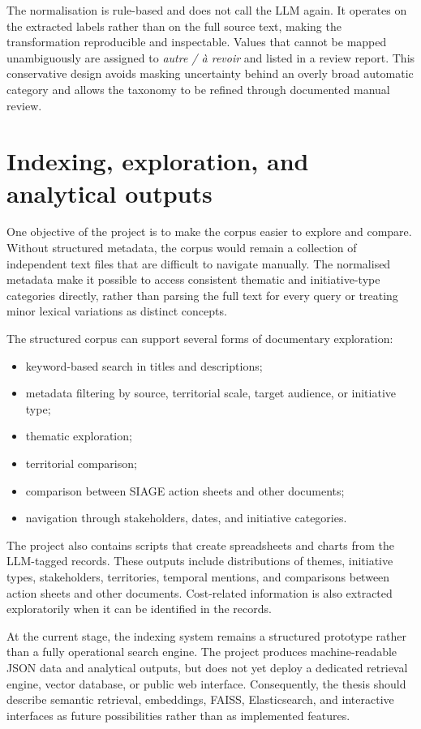 \documentclass[
11pt,
english,
singlespacing,
headsepline,
]{MastersDoctoralThesis}
\begin{document}
The normalisation is rule-based and does not call the LLM again. It operates on
the extracted labels rather than on the full source text, making the
transformation reproducible and inspectable. Values that cannot be mapped
unambiguously are assigned to \textit{autre / à revoir} and listed in a review
report. This conservative design avoids masking uncertainty behind an overly
broad automatic category and allows the taxonomy to be refined through
documented manual review.


\section{Indexing, exploration, and analytical outputs}

One objective of the project is to make the corpus easier to explore and compare.
Without structured metadata, the corpus would remain a collection of independent
text files that are difficult to navigate manually. The normalised metadata make
it possible to access consistent thematic and initiative-type categories
directly, rather than parsing the full text for every query or treating minor
lexical variations as distinct concepts.

The structured corpus can support several forms of documentary exploration:

\begin{itemize}
    \item keyword-based search in titles and descriptions;
    \item metadata filtering by source, territorial scale, target audience, or
    initiative type;
    \item thematic exploration;
    \item territorial comparison;
    \item comparison between SIAGE action sheets and other documents;
    \item navigation through stakeholders, dates, and initiative categories.
\end{itemize}

The project also contains scripts that create spreadsheets and charts from the
LLM-tagged records. These outputs include distributions of themes, initiative
types, stakeholders, territories, temporal mentions, and comparisons between
action sheets and other documents. Cost-related information is also extracted
exploratorily when it can be identified in the records.

At the current stage, the indexing system remains a structured prototype rather
than a fully operational search engine. The project produces machine-readable
JSON data and analytical outputs, but does not yet deploy a dedicated retrieval
engine, vector database, or public web interface. Consequently, the thesis
should describe semantic retrieval, embeddings, FAISS, Elasticsearch, and
interactive interfaces as future possibilities rather than as implemented
features.
\end{document}
